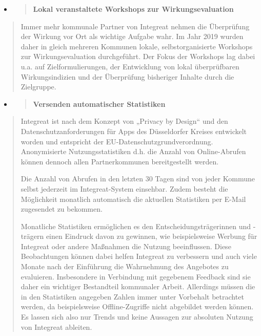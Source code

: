 \documentclass[12pt, a4paper]{article} %
\begin{document}
\begin{itemize}
\item
  \begin{quote}
  \textbf{Lokal veranstaltete Workshops zur Wirkungsevaluation}
  \end{quote}
\end{itemize}

\begin{quote}
Immer mehr kommunale Partner von Integreat nehmen die Überprüfung der
Wirkung vor Ort als wichtige Aufgabe wahr. Im Jahr 2019 wurden daher in
gleich mehreren Kommunen lokale, selbstorganisierte Workshops zur
Wirkungsevaluation durchgeführt. Der Fokus der Workshops lag dabei u.a.
auf Zielformulierungen, der Entwicklung von lokal überprüfbaren
Wirkungsindizien und der Überprüfung bisheriger Inhalte durch die
Zielgruppe.
\end{quote}

\begin{itemize}
\item
  \begin{quote}
  \textbf{Versenden automatischer Statistiken}
  \end{quote}
\end{itemize}

\begin{quote}
Integreat ist nach dem Konzept von „Privacy by Design“ und den
Datenschutzanforderungen für Apps des Düsseldorfer Kreises entwickelt
worden und entspricht der EU-Datenschutzgrundverordnung. Anonymisierte
Nutzungsstatistiken d.h. die Anzahl von Online-Abrufen können dennoch
allen Partnerkommunen bereitgestellt werden.

Die Anzahl von Abrufen in den letzten 30 Tagen sind von jeder Kommune
selbst jederzeit im Integreat-System einsehbar. Zudem besteht die
Möglichkeit monatlich automatisch die aktuellen Statistiken per E-Mail
zugesendet zu bekommen.

Monatliche Statistiken ermöglichen es den Entscheidungsträgerinnen und
-trägern einen Eindruck davon zu gewinnen, wie beispielsweise Werbung
für Integreat oder andere Maßnahmen die Nutzung beeinflussen. Diese
Beobachtungen können dabei helfen Integreat zu verbessern und auch viele
Monate nach der Einführung die Wahrnehmung des Angebotes zu evaluieren.
Insbesondere in Verbindung mit gegebenem Feedback sind sie daher ein
wichtiger Bestandteil kommunaler Arbeit. Allerdings müssen die in den
Statistiken angegeben Zahlen immer unter Vorbehalt betrachtet werden, da
beispielsweise Offline-Zugriffe nicht abgebildet werden können. Es
lassen sich also nur Trends und keine Aussagen zur absoluten Nutzung von
Integreat ableiten.
\end{quote}
\end{document}
